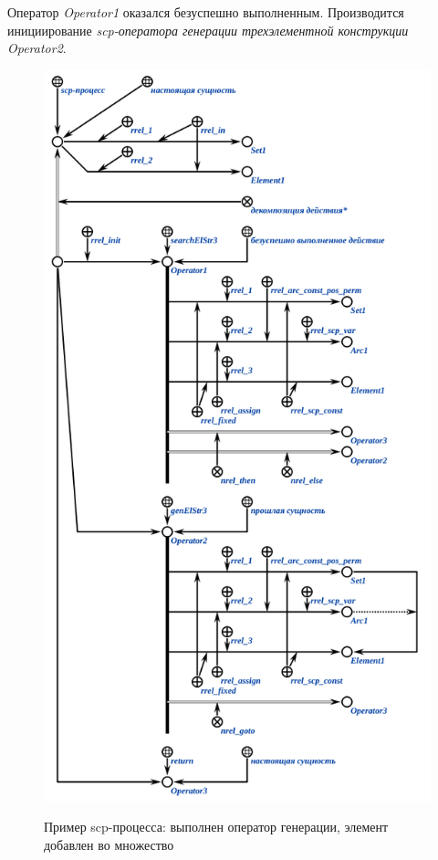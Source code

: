 Оператор \textit{Operator1} оказался безуспешно выполненным. Производится инициирование \textit{\mbox{scp-оператора} генерации трехэлементной конструкции} ~~~ \textit{Operator2}.

\begin{figure}[H]
	\centering
	\caption{Пример scp-процесса: выполнен оператор генерации, элемент добавлен во множество}
	\includegraphics[scale=0.8]{images/part3/chapter_situation_management/process_example3.png}
	\label{fig:process_example3}
\end{figure}

